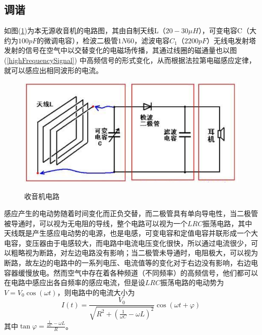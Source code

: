 \documentclass[10pt,a4paper]{article}
\theoremstyle{remark}
\begin{document}
\subsection{调谐}
如图(\ref{circuitOfHomemadeRadio})为本无源收音机的电路图，其由自制天线L（$20-30\mu H$），可变电容C（大约为$100pF$的微调电容），检波二极管$1N60$，滤波电容$C_1$（$2200pF$）无线电发射塔发射的信号在空气中以交替变化的电磁场传播，其通过线圈的磁通量也以图(\ref{highFrequencySignal}) 中高频信号的形式变化，从而根据法拉第电磁感应定律，就可以感应出相同波形的电流。
\begin{figure}
  \centering
  \includegraphics[scale = 0.6]{circuitOfHomemadeRadio}\\
  \caption{收音机电路}\label{circuitOfHomemadeRadio}
\end{figure}

感应产生的电动势随着时间变化而正负交替，而二极管具有单向导电性，当二极管被导通时，可以视为无电阻的导线，整个电路可以视为一个$LRC$振荡电路，其中天线既是产生感应电动势的电源，也是电感，可变电容和定值电容并联形成一个大电容，变压器由于电感较大，而电路中电流电压变化很快，所以通过电流很少，可以粗略视为断路，对左边电路没有影响；当二极管未导通时，电阻极大，可以视为断路，故左边的电路中的一系列电压、电流值等的变化对于右边没有影响，右边电容器缓慢放电。然而空气中存在着各种频道（不同频率）的高频信号，他们都可以在电路中感应出各自频率的感应电流，但是设$LRC$振荡电路的电动势为$V = V_0\cos(\omega t)$，则电路中的电流大小为
\[
I(t) = \frac{V_0}{\sqrt{R^2 + (\frac{1}{\omega C} - \omega L)^2}}\cos(\omega t + \varphi)
\]
其中$\tan\varphi = \frac{\frac{1}{\omega C} - \omega L}{R}$。
\end{document}
